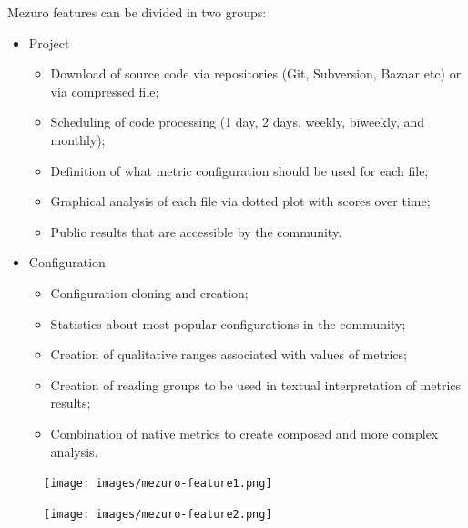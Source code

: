 \documentclass{llncs}
\begin{document}
Mezuro features can be divided in two groups:

\begin{itemize}
    \item Project

    \begin{itemize}
        \item Download of source code via repositories (Git, Subversion, Bazaar etc) or via compressed file;
        \item Scheduling of code processing (1 day, 2 days, weekly, biweekly, and monthly);
        \item Definition of what metric configuration should be used for each file;
        \item Graphical analysis of each file via dotted plot with scores over time;
        \item Public results that are accessible by the community.
    \end{itemize}
    \item Configuration
    \begin{itemize}
        \item Configuration cloning and creation;
        \item Statistics about most popular configurations in the community;
        \item Creation of qualitative ranges associated with values of metrics;
        \item Creation of reading groups to be used in textual interpretation of metrics results;
        \item Combination of native metrics to create composed and more complex analysis.
    \end{itemize}
\end{itemize}

\begin{figure}[H]
    \centering
    \begin{minipage}{.5\textwidth}
        \centering
        \texttt{[image: images/mezuro-feature1.png]}
        \label{fig:feature-1}
    \end{minipage}%
    \begin{minipage}{.5\textwidth}
        \centering
        \texttt{[image: images/mezuro-feature2.png]}
        \label{fig:feature-2}
    \end{minipage}
\end{figure}
\end{document}
